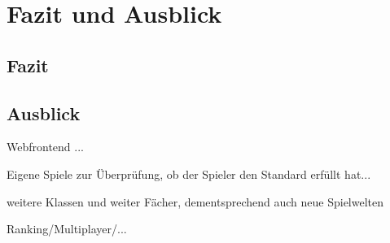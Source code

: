 \chapter{Fazit und Ausblick}
\section{Fazit}
\section{Ausblick}
	Webfrontend ...
	
	Eigene Spiele zur Überprüfung, ob der Spieler den Standard erfüllt hat...
	
	weitere Klassen und weiter Fächer, dementsprechend auch neue Spielwelten
	
	Ranking/Multiplayer/...